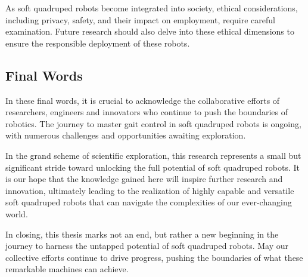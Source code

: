 As soft quadruped robots become integrated into society, ethical considerations, including privacy, safety, and their impact on employment, require careful examination. Future research should also delve into these ethical dimensions to ensure the responsible deployment of these robots.

\subsection{Final Words}
In these final words, it is crucial to acknowledge the collaborative efforts of researchers, engineers and innovators who continue to push the boundaries of robotics. The journey to master gait control in soft quadruped robots is ongoing, with numerous challenges and opportunities awaiting exploration.

In the grand scheme of scientific exploration, this research represents a small but significant stride toward unlocking the full potential of soft quadruped robots. It is our hope that the knowledge gained here will inspire further research and innovation, ultimately leading to the realization of highly capable and versatile soft quadruped robots that can navigate the complexities of our ever-changing world.

In closing, this thesis marks not an end, but rather a new beginning in the journey to harness the untapped potential of soft quadruped robots. May our collective efforts continue to drive progress, pushing the boundaries of what these remarkable machines can achieve.






